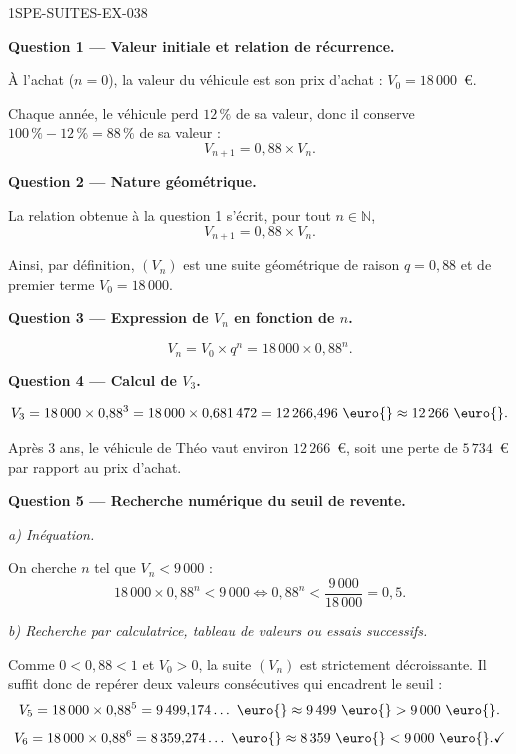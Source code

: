 \begin{corrige}{1SPE-SUITES-EX-038}

\textbf{Question 1 — Valeur initiale et relation de récurrence.}

À l'achat ($n = 0$), la valeur du véhicule est son prix d'achat : $V_0 = 18\,000$~\euro{}.

Chaque année, le véhicule perd $12\,\%$ de sa valeur, donc il conserve $100\,\% - 12\,\% = 88\,\%$ de sa valeur :
\[
  V_{n+1} = 0{,}88 \times V_n.
\]

\medskip
\textbf{Question 2 — Nature géométrique.}

La relation obtenue à la question 1 s'écrit, pour tout $n \in \mathbb{N}$,
\[
  V_{n+1} = 0{,}88 \times V_n.
\]


Ainsi, par définition, $(V_n)$ est une suite géométrique de raison $q = 0{,}88$ et de premier terme $V_0 = 18\,000$.

\medskip
\textbf{Question 3 — Expression de $V_n$ en fonction de $n$.}

\[
  V_n = V_0 \times q^n = 18\,000 \times 0{,}88^n.
\]

\medskip
\textbf{Question 4 — Calcul de $V_3$.}

\[
  V_3 = 18\,000 \times 0{,}88^3 = 18\,000 \times 0{,}681\,472 = 12\,266{,}496 \text{ \euro{}} \approx 12\,266 \text{ \euro{}}.
\]

Après $3$ ans, le véhicule de Théo vaut environ $12\,266$~\euro{}, soit une perte de $5\,734$~\euro{} par rapport au prix d'achat.

\medskip
\textbf{Question 5 — Recherche numérique du seuil de revente.}

\textit{a) Inéquation.}

On cherche $n$ tel que $V_n < 9\,000$ :
\[
  18\,000 \times 0{,}88^n < 9\,000 \iff 0{,}88^n < \frac{9\,000}{18\,000} = 0{,}5.
\]

\textit{b) Recherche par calculatrice, tableau de valeurs ou essais successifs.}

Comme $0 < 0{,}88 < 1$ et $V_0>0$, la suite $(V_n)$ est strictement décroissante. Il suffit donc de repérer deux valeurs consécutives qui encadrent le seuil :
\[
  V_5 = 18\,000 \times 0{,}88^5 = 9\,499{,}174\ldots \text{ \euro{}} \approx 9\,499 \text{ \euro{}} > 9\,000 \text{ \euro{}}.
\]
\[
  V_6 = 18\,000 \times 0{,}88^6 = 8\,359{,}274\ldots \text{ \euro{}} \approx 8\,359 \text{ \euro{}} < 9\,000 \text{ \euro{}}. \checkmark
\]


\end{corrige}
